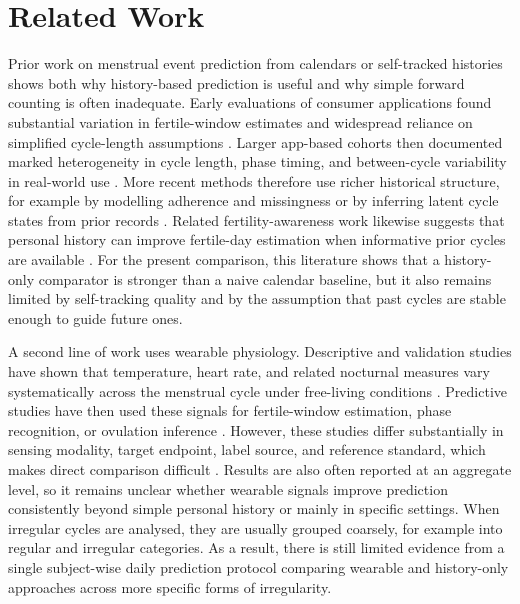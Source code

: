 \documentclass[conference]{IEEEtran}
\begin{document}
\section{Related Work}
Prior work on menstrual event prediction from calendars or self-tracked histories shows both why history-based prediction is useful and why simple forward counting is often inadequate. Early evaluations of consumer applications found substantial variation in fertile-window estimates and widespread reliance on simplified cycle-length assumptions \cite{setton2016accuracy,moglia2016evaluation}. Larger app-based cohorts then documented marked heterogeneity in cycle length, phase timing, and between-cycle variability in real-world use \cite{symul2019assessment,bull2019realworld,grieger2020global,li2020characterizing}. More recent methods therefore use richer historical structure, for example by modelling adherence and missingness or by inferring latent cycle states from prior records \cite{li2021predictive,symul2022labeling}. Related fertility-awareness work likewise suggests that personal history can improve fertile-day estimation when informative prior cycles are available \cite{li2016personalised}. For the present comparison, this literature shows that a history-only comparator is stronger than a naive calendar baseline, but it also remains limited by self-tracking quality and by the assumption that past cycles are stable enough to guide future ones.

A second line of work uses wearable physiology. Descriptive and validation studies have shown that temperature, heart rate, and related nocturnal measures vary systematically across the menstrual cycle under free-living conditions \cite{goodale2019wearable,maijala2019nocturnal,alzueta2022tracking,jasinski2024cardiovascular}. Predictive studies have then used these signals for fertile-window estimation, phase recognition, or ovulation inference \cite{yu2022tracking,thigpen2025oura,luo2025prediction,kilungeja2025machine,masuda2025machine}. However, these studies differ substantially in sensing modality, target endpoint, label source, and reference standard, which makes direct comparison difficult \cite{shi2026diagnostic}. Results are also often reported at an aggregate level, so it remains unclear whether wearable signals improve prediction consistently beyond simple personal history or mainly in specific settings. When irregular cycles are analysed, they are usually grouped coarsely, for example into regular and irregular categories. As a result, there is still limited evidence from a single subject-wise daily prediction protocol comparing wearable and history-only approaches across more specific forms of irregularity.
\end{document}
